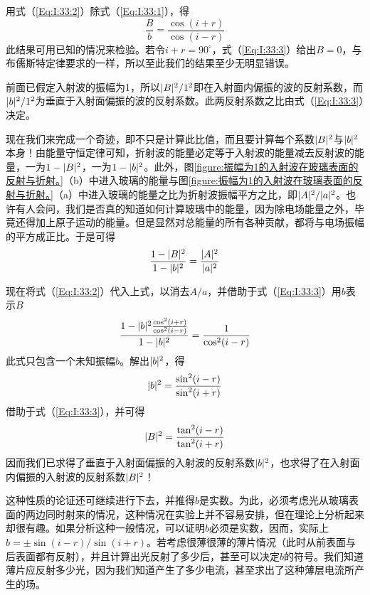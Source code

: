 用式（\ref{Eq:I:33:2}）除式（\ref{Eq:I:33:1}），得
\begin{equation}
    \label{Eq:I:33:3}
    \frac{B}{b} = \frac{\cos(i+r)}{\cos(i-r)}
\end{equation}
此结果可用已知的情况来检验。若令$i+r=90^\circ$，式（\ref{Eq:I:33:3}）给出$B=0$，与布儒斯特定律要求的一样，所以至此我们的结果至少无明显错误。

前面已假定入射波的振幅为1，所以$\lvert B\rvert^2/1^2$即在入射面内偏振的波的反射系数，而$\lvert b\rvert^2/1^2$为垂直于入射面偏振的波的反射系数。此两反射系数之比由式（\ref{Eq:I:33:3}）决定。

现在我们来完成一个奇迹，即不只是计算此比值，而且要计算每个系数$\lvert B\rvert^2$与$\lvert b\rvert^2$本身！由能量守恒定律可知，折射波的能量必定等于入射波的能量减去反射波的能量，一为$1-\lvert B\rvert^2$，一为$1-\lvert b\rvert^2$。此外，图\ref{figure:振幅为1的入射波在玻璃表面的反射与折射。}（b）中进入玻璃的能量与图\ref{figure:振幅为1的入射波在玻璃表面的反射与折射。}（a）中进入玻璃的能量之比为折射波振幅平方之比，即$\lvert A\rvert^2/\lvert a\rvert^2$。也许有人会问，我们是否真的知道如何计算玻璃中的能量，因为除电场能量之外，毕竟还得加上原子运动的能量。但是显然对总能量的所有各种贡献，都将与电场振幅的平方成正比。于是可得
\begin{equation}
    \label{Eq:I:33:4}
    \frac{1-\lvert B\rvert^2}{1-\lvert b\rvert^2} = \frac{\lvert A\rvert^2}{\lvert a\rvert^2}
\end{equation}

现在将式（\ref{Eq:I:33:2}）代入上式，以消去$A/a$，并借助于式（\ref{Eq:I:33:3}）用$b$表示$B$
\begin{equation}
    \label{Eq:I:33:5}
    \frac{1-\lvert b\rvert^2\frac{\cos^2(i+r)}{\cos^2(i-r)}}{1-\lvert b\rvert^2} = \frac{1}{\cos^2(i-r)}
\end{equation}
此式只包含一个未知振幅$b$。解出$\lvert b\rvert^2$，得
\begin{equation}
    \label{Eq:I:33:6}
    \lvert b\rvert^2 = \frac{\sin^2(i-r)}{\sin^2(i+r)}
\end{equation}
借助于式（\ref{Eq:I:33:3}），并可得
\begin{equation}
    \label{Eq:I:33:7}
    \lvert B\rvert^2 = \frac{\tan^2(i-r)}{\tan^2(i+r)}
\end{equation}
因而我们已求得了垂直于入射面偏振的入射波的反射系数$\lvert b\rvert^2$，也求得了在入射面内偏振的入射波的反射系数$\lvert B\rvert^2$！

这种性质的论证还可继续进行下去，并推得$b$是实数。为此，必须考虑光从玻璃表面的两边同时射来的情况，这种情况在实验上并不容易安排，但在理论上分析起来却很有趣。如果分析这种一般情况，可以证明$b$必须是实数，因而，实际上$b=\pm \sin(i-r)/\sin(i+r)$。若考虑很薄很薄的薄片情况（此时从前表面与后表面都有反射），并且计算出光反射了多少后，甚至可以决定$b$的符号。我们知道薄片应反射多少光，因为我们知道产生了多少电流，甚至求出了这种薄层电流所产生的场。

